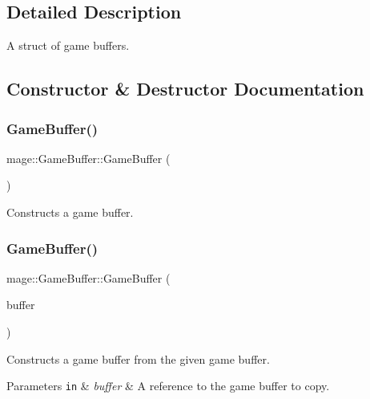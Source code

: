 \subsection{Detailed Description}
A struct of game buffers. 

\subsection{Constructor \& Destructor Documentation}
\hypertarget{structmage_1_1_game_buffer_ade6ea6f9d04f829d990b848f9e210349}{}\label{structmage_1_1_game_buffer_ade6ea6f9d04f829d990b848f9e210349} 
\subsubsection{\texorpdfstring{Game\+Buffer()}{GameBuffer()}\hspace{0.1cm}{\footnotesize\ttfamily [1/3]}}
{\footnotesize\ttfamily mage\+::\+Game\+Buffer\+::\+Game\+Buffer (\begin{DoxyParamCaption}{ }\end{DoxyParamCaption})}

Constructs a game buffer. \hypertarget{structmage_1_1_game_buffer_a654d6f8d44dcc00b6693840125fb81ff}{}\label{structmage_1_1_game_buffer_a654d6f8d44dcc00b6693840125fb81ff} 
\subsubsection{\texorpdfstring{Game\+Buffer()}{GameBuffer()}\hspace{0.1cm}{\footnotesize\ttfamily [2/3]}}
{\footnotesize\ttfamily mage\+::\+Game\+Buffer\+::\+Game\+Buffer (\begin{DoxyParamCaption}\item[{const \hyperlink{structmage_1_1_game_buffer}{Game\+Buffer} \&}]{buffer }\end{DoxyParamCaption})\hspace{0.3cm}{\ttfamily [default]}}

Constructs a game buffer from the given game buffer.


\begin{DoxyParams}[1]{Parameters}
\mbox{\tt in}  & {\em buffer} & A reference to the game buffer to copy. \\
\hline
\end{DoxyParams}
\hypertarget{structmage_1_1_game_buffer_a012cbf18353f056094ebc27d19f93ad1}{}\label{structmage_1_1_game_buffer_a012cbf18353f056094ebc27d19f93ad1} 
